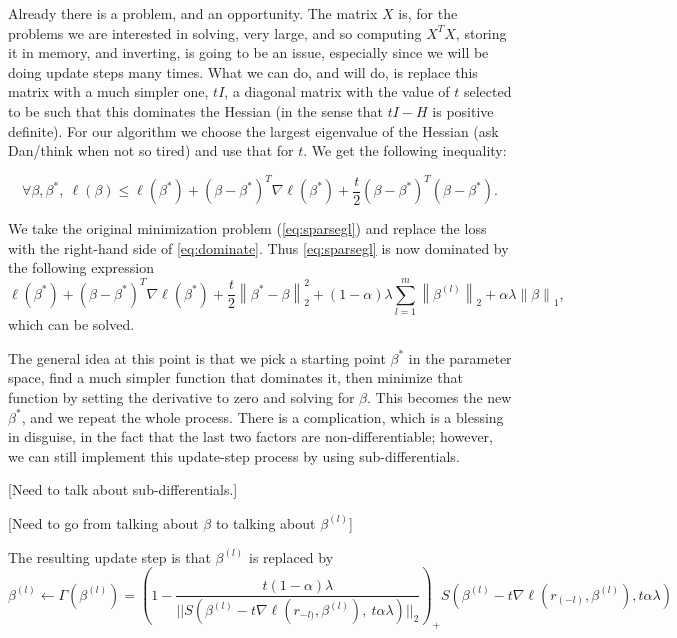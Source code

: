 \documentclass[titlepage]{article}
\newcommand{\norm}[1]{\left\lVert #1 \right\rVert}
\begin{document}
Already there is a problem, and an opportunity. The matrix $X$ is, for the problems we are interested in solving, very large, and so computing $X^TX$, storing it in memory, and inverting, is going to be an issue, especially since we will be doing update steps many times. What we can do, and will do, is replace this matrix with a much simpler one, $tI$, a diagonal matrix with the value of $t$ selected to be such that this dominates the Hessian (in the sense that $tI - H$ is positive definite). For our algorithm we choose the largest eigenvalue of the Hessian (ask Dan/think when not so tired) and use that for $t$. We get the following inequality:



\begin{equation}
\forall \beta,\beta^*,\ \ell(\beta) \leq \ell(\beta^*)+(\beta - \beta^*)^T\nabla \ell(\beta^*)+\frac{t}{2}(\beta - \beta^*)^T  (\beta - \beta^*).
\label{eq:dominate}
\end{equation}

We take the original minimization problem (\autoref{eq:sparsegl}) and replace the loss with the right-hand side of \autoref{eq:dominate}. Thus \autoref{eq:sparsegl} is now dominated by the following expression
\begin{equation}
\ell(\beta^*)+(\beta - \beta^*)^T\nabla \ell(\beta^*)+\frac{t}{2}\norm{\beta^*-\beta}_2^2+ (1-\alpha)\lambda\sum_{l=1}^m\norm{\beta^{(l)}}_2+\alpha\lambda\norm{\beta}_1,
\end{equation}
which can be solved. 

The general idea at this point is that we pick a starting point $\beta^*$ in the parameter space, find a much simpler function that dominates it, then minimize that function by setting the derivative to zero and solving for $\beta$. This becomes the new $\beta^*$, and we repeat the whole process. There is a complication, which is a blessing in disguise, in the fact that the last two factors are non-differentiable; however, we can still implement this update-step process by using sub-differentials.

[Need to talk about sub-differentials.]


[Need to go from talking about $\beta$ to talking about $\beta^{(l)}$]


The resulting update step is that $\beta^{(l)}$ is replaced by
\begin{equation}
\beta^{(l)} \leftarrow \Gamma(\beta^{(l)}) =
\left(1-\frac{t(1-\alpha)\lambda}{||S(\beta^{(l)}-t\nabla \ell(r_{-l)},\beta^{(l)}),\ t\alpha\lambda)||_2}\right)_+ S(\beta^{(l)}-t\nabla \ell(r_{(-l)},\beta^{(l)}),t\alpha\lambda)
\label{eq:updateStep}
\end{equation}
\end{document}
